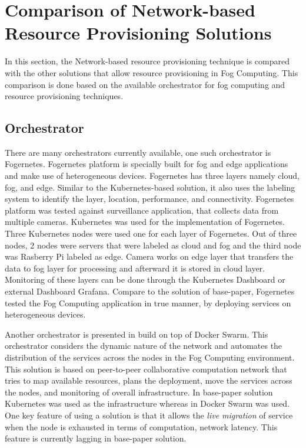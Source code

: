 \section{Comparison of Network-based Resource Provisioning Solutions}
\label{sec:related_work}
In this section, the Network-based resource provisioning technique is compared with the other solutions that allow resource provisioning in Fog Computing. This comparison is done based on the available orchestrator for fog computing and resource provisioning techniques.
\subsection{Orchestrator}
\label{sec:infra}
There are many orchestrators currently available, one such orchestrator is Fogernetes\cite{Wobker2018}. Fogernetes\cite{Wobker2018} platform is specially built for fog and edge applications and make use of heterogeneous devices. Fogernetes\cite{Wobker2018} has three layers namely cloud, fog, and edge. Similar to the Kubernetes-based solution\cite{Santos2019}, it also uses the labeling system to identify the layer, location, performance, and connectivity\cite{Wobker2018}. Fogernetes\cite{Wobker2018} platform was tested against surveillance application, that collects data from multiple cameras. Kubernetes was used for the implementation of Fogernetes\cite{Wobker2018}. Three Kubernetes nodes were used one for each layer of Fogernetes\cite{Wobker2018}. Out of three nodes, 2 nodes were servers that were labeled as cloud and fog and the third node was Rasberry Pi labeled as edge\cite{Wobker2018}. Camera works on edge layer that transfers the data to fog layer for processing and afterward it is stored in cloud layer. Monitoring of these layers can be done through the  Kubernetes Dashboard or external Dashboard Grafana. Compare to the solution of base-paper\cite{Santos2019}, Fogernetes\cite{Wobker2018} tested the Fog Computing application in true manner, by deploying services on heterogeneous devices. \par
Another orchestrator is presented in \cite{Reale} build on top of Docker Swarm. This orchestrator considers the dynamic nature of the network and automates the distribution of the services across the nodes in the Fog Computing environment\cite{Reale}. This solution is based on peer-to-peer collaborative computation network that tries to map available resources, plans the deployment, move the services across the nodes, and monitoring of overall infrastructure\cite{Reale}. In base-paper solution\cite{Santos2019} Kubernetes was used as the infrastructure whereas in \cite{Reale} Docker Swarm was used. One key feature of using a solution\cite{Reale} is that it allows the \emph{live migration} of service when the node is exhausted in terms of computation, network latency. This feature is currently lagging in base-paper solution\cite{Santos2019}.
